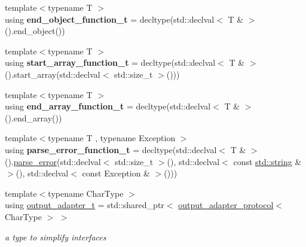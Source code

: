 \begin{DoxyCompactItemize}
{\footnotesize template$<$typename T $>$ }\\using {\bfseries end\+\_\+object\+\_\+function\+\_\+t} = decltype(std\+::declval$<$ T \& $>$().end\+\_\+object())
\item 
\mbox{\label{namespacenlohmann_1_1detail_a80273cecc45765d7b2826ec931fbffdd}} 
{\footnotesize template$<$typename T $>$ }\\using {\bfseries start\+\_\+array\+\_\+function\+\_\+t} = decltype(std\+::declval$<$ T \& $>$().start\+\_\+array(std\+::declval$<$ std\+::size\+\_\+t $>$()))
\item 
\mbox{\label{namespacenlohmann_1_1detail_aec53c029383b34a72182210e58fadb79}} 
{\footnotesize template$<$typename T $>$ }\\using {\bfseries end\+\_\+array\+\_\+function\+\_\+t} = decltype(std\+::declval$<$ T \& $>$().end\+\_\+array())
\item 
\mbox{\label{namespacenlohmann_1_1detail_a264d4d58bc1fd82bcc7bf6bf73d6acad}} 
{\footnotesize template$<$typename T , typename Exception $>$ }\\using {\bfseries parse\+\_\+error\+\_\+function\+\_\+t} = decltype(std\+::declval$<$ T \& $>$().\mbox{\hyperlink{classnlohmann_1_1detail_1_1parse__error}{parse\+\_\+error}}(std\+::declval$<$ std\+::size\+\_\+t $>$(), std\+::declval$<$ const \mbox{\hyperlink{namespacenlohmann_1_1detail_a1ed8fc6239da25abcaf681d30ace4985ab45cffe084dd3d20d928bee85e7b0f21}{std\+::string}} \& $>$(), std\+::declval$<$ const Exception \& $>$()))
\item 
\mbox{\label{namespacenlohmann_1_1detail_a9b680ddfb58f27eb53a67229447fc556}} 
{\footnotesize template$<$typename Char\+Type $>$ }\\using \mbox{\hyperlink{namespacenlohmann_1_1detail_a9b680ddfb58f27eb53a67229447fc556}{output\+\_\+adapter\+\_\+t}} = std\+::shared\+\_\+ptr$<$ \mbox{\hyperlink{structnlohmann_1_1detail_1_1output__adapter__protocol}{output\+\_\+adapter\+\_\+protocol}}$<$ Char\+Type $>$ $>$
\begin{DoxyCompactList}\small\item\em a type to simplify interfaces \end{DoxyCompactList}\end{DoxyCompactItemize}
